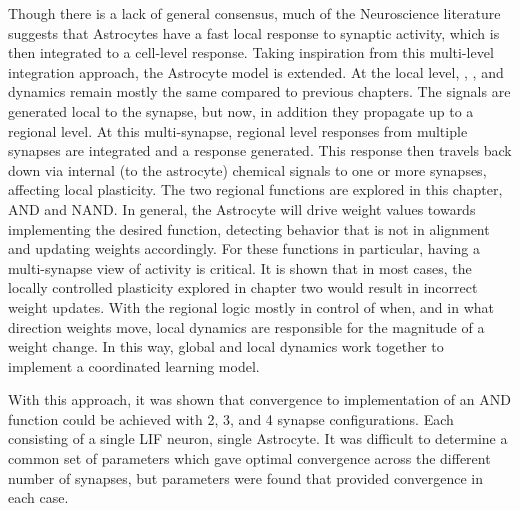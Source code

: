 Though there is a lack of general consensus, much of the Neuroscience literature
suggests that Astrocytes have a fast local response to synaptic activity, which
is then integrated to a cell-level response. Taking inspiration from this
multi-level integration approach, the Astrocyte model is extended. At the local
level, \ipt, \kp, and \ca dynamics remain mostly the same compared to previous
chapters. The \ca signals are generated local to the synapse, but now, in
addition they propagate up to a regional level. At this multi-synapse, regional
level \ca responses from multiple synapses are integrated and a response
generated. This response then travels back down via internal (to the astrocyte)
chemical signals to one or more synapses, affecting local plasticity. The two
regional functions are explored in this chapter, AND and NAND. In general, the
Astrocyte will drive weight values towards implementing the desired function,
detecting behavior that is not in alignment and updating weights
accordingly. For these functions in particular, having a multi-synapse view of
activity is critical. It is shown that in most cases, the locally controlled
plasticity explored in chapter two would result in incorrect weight
updates. With the regional logic mostly in control of when, and in what
direction weights move, local dynamics are responsible for the magnitude of a
weight change. In this way, global and local dynamics work together to implement
a coordinated learning model.

With this approach, it was shown that convergence to implementation of an AND
function could be achieved with 2, 3, and 4 synapse configurations. Each
consisting of a single LIF neuron, single Astrocyte. It was difficult to
determine a common set of parameters which gave optimal convergence across the
different number of synapses, but parameters were found that provided
convergence in each case.
